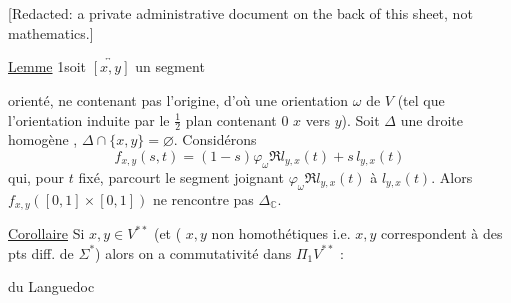 [Redacted: a private administrative document on the back of this sheet, not mathematics.]

\uline{Lemme} 1\quad soit $\overleftrightarrow{[x,y]}$ un segment


orienté, ne contenant pas l'origine, d'où
une orientation $\omega$ de $V$
(tel que l'orientation  induite par le
$\frac12$ plan contenant \deleted{$\unsure{\Delta}$} $0$
  
$x$ vers $y$).
 Soit
$\Delta$ une droite homogène ,
 
 $\Delta\cap\{x,y\}=\varnothing$.
Considérons
\[
f_{x,y}(s,t)=(1-s)\varphi_\omega\Re l_{y,x}(t)+s\,l_{y,x}(t)
\]
qui, pour $t$ fixé, parcourt le segment joignant
$\varphi_\omega\Re l_{y,x}(t)$ à $l_{y,x}(t)$. Alors
$f_{x,y}([0,1]\times[0,1])$ ne rencontre pas $\Delta_{\mathbb C}$.


\uline{Corollaire}\quad {}
Si $x,y\in V^{**}$  (et
( $x,y$ non homothétiques i.e. $x,y$ correspondent
à des pts diff. de $\Sigma^*$) alors on a
commutativité dans $\Pi_1V^{**}$ :

du Languedoc

